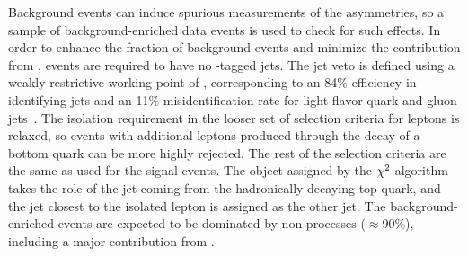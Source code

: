 Background events can induce spurious measurements of the asymmetries, so a sample of background-enriched data events is used to check for such effects.
In order to enhance the fraction of background events and minimize the contribution from \ttbar, events are required to have no \PQb-tagged jets.
The \PQb jet veto is defined using a weakly restrictive working point of \DeepCSV, corresponding to an 84\% efficiency in identifying \PQb jets and an 11\% misidentification rate for light-flavor quark and gluon jets~\cite{CMS:bjet_eff}.
The isolation requirement in the looser set of selection criteria for leptons is relaxed, so events with additional leptons produced through the decay of a bottom quark can be more highly rejected.
The rest of the selection criteria are the same as used for the signal events.
The object assigned by the $\chi^2$ algorithm takes the role of the \PQb jet coming from the hadronically decaying top quark, and the jet closest to the isolated lepton is assigned as the other \PQb jet.
The background-enriched events are expected to be dominated by non-\ttbar processes ($\approx$90\%), including a major contribution from \Wjets.
